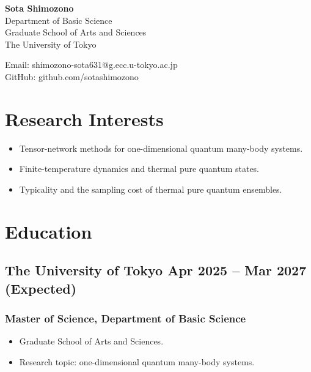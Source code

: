 \documentclass[11pt]{article}
\begin{document}
\begin{center}
	\begin{minipage}{0.5\textwidth}
		{\Huge\bfseries Sota Shimozono} \\ \medskip
		Department of Basic Science \\
		Graduate School of Arts and Sciences \\
		The University of Tokyo
	\end{minipage} \hfill
	\begin{minipage}{0.4\textwidth}
		\raggedleft
		Email: shimozono-sota631@g.ecc.u-tokyo.ac.jp \\
		GitHub: github.com/sotashimozono
	\end{minipage}
\end{center}

\section{Research Interests}
\begin{itemize}
	\item Tensor-network methods for one-dimensional quantum many-body systems.
	\item Finite-temperature dynamics and thermal pure quantum states.
	\item Typicality and the sampling cost of thermal pure quantum ensembles.
\end{itemize}

\section{Education}
\subsection{The University of Tokyo \hfill Apr 2025 -- Mar 2027 (Expected)}
\subsubsection{Master of Science, Department of Basic Science}
\begin{itemize}
	\item Graduate School of Arts and Sciences.
	\item Research topic: one-dimensional quantum many-body systems.
\end{itemize}
\end{document}

